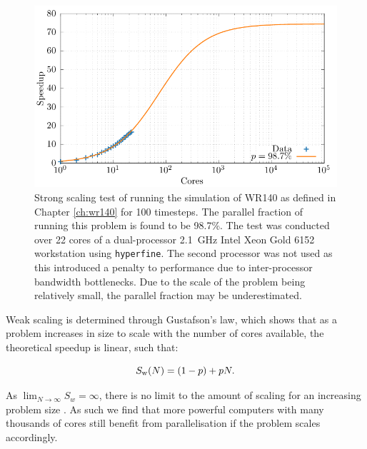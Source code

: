 \begin{figure}
  \centering
  \includegraphics{assets/athena-amdahl/amdahl.pdf}
  \caption[Strong scaling test of \athena]{Strong scaling test of \athena{} running the simulation of WR140 as defined in Chapter \ref{ch:wr140} for 100 timesteps. The parallel fraction of \athena{} running this problem is found to be 98.7\%. The test was conducted over 22 cores of a dual-processor \SI{2.1}{\giga\hertz} Intel Xeon Gold 6152 workstation using \texttt{hyperfine}. The second processor was not used as this introduced a penalty to performance due to inter-processor bandwidth bottlenecks. Due to the scale of the problem being relatively small, the parallel fraction may be underestimated.}
  \label{fig:amdahl-athena}
\end{figure}

Weak scaling is determined through Gustafson's law, which shows that as a problem increases in size to scale with the number of cores available, the theoretical speedup is linear, such that:

\begin{equation}
  S_\text{w}(N) = (1-p) + pN.
\end{equation}

\noindent
As $\lim_{N\rightarrow\infty} S_w = \infty$, there is no limit to the amount of scaling for an increasing problem size \parencite{gustafsonReevaluatingAmdahlLaw1988}.
As such we find that more powerful computers with many thousands of cores still benefit from parallelisation if the problem scales accordingly.

